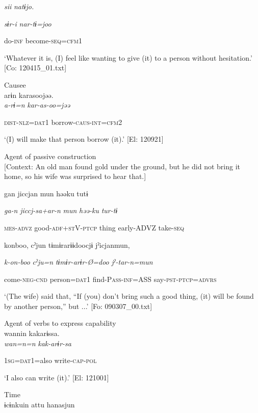       \textit{sii}  \textit{natɨjo.}

      \textit{sɨr-i}  \textit{nar-tɨ=joo}

      do-\textsc{inf}  become-\textsc{seq}=\textsc{cfm}1

\glt ‘Whatever it is, (I) feel like wanting to give (it) to a person without hesitation.’ [Co: 120415\_01.txt]
\z

 \ex Causee\\
{\TM}
\gll  arɨn  karasoojəə.\\

      \textit{a-rɨ=n}  \textit{kar-as-oo=jəə}

      \textsc{dist}-\textsc{nlz}=\textsc{dat}1  borrow-\textsc{caus}-\textsc{int}=\textsc{cfm}2

\glt ‘(I) will make that person borrow (it).’ [El: 120921]

 \ex Agent of passive construction\\{}
[Context: An old man found gold under the ground, but he did not bring it home, so his wife was surprised to hear that.]

{\TM}
\gll gan  jiccjan  mun  həəku  tutɨ

      \textit{ga-n}  \textit{jiccj-sa+ar-n}  \textit{mun}  \textit{həə-ku}  \textit{tur-tɨ}

      \textsc{mes}-\textsc{advz}  good-\textsc{adf}+\textsc{st}V-\textsc{ptcp}  thing  early-ADVZ  take-\textsc{seq}

      konboo,  cˀjun  tɨmɨrarɨɨdoocjɨ  jˀicjanmun,

      \textit{k-on-boo}  \textit{cˀju=n}  \textit{tɨmɨr-arɨr-Ø=doo}  \textit{jˀ-tar-n=mun}

      come-\textsc{neg}-\textsc{cnd}  person=\textsc{dat}1  find{}-P\textsc{ass}-\textsc{inf}=ASS  say{}-\textsc{pst}-\textsc{ptcp}=\textsc{advrs}

\glt ‘(The wife) said that, “If (you) don’t bring such a good thing, (it) will be found by another person,” but ...’ [Fo: 090307\_00.txt]
\z

 \ex Agent of verbs to express capability\\
{\TM}
\gll  wannin  kakarɨssa.\\

      \textit{wan=n=n}  \textit{kak-arɨr-sa}

      1\textsc{sg}=\textsc{dat}1=also  write-\textsc{cap}-\textsc{pol}

\glt ‘I also can write (it).’ [El: 121001]

 \ex Time\\
{\TM}
\gll  ɨcɨnkuin  attu  hanasjun\\

